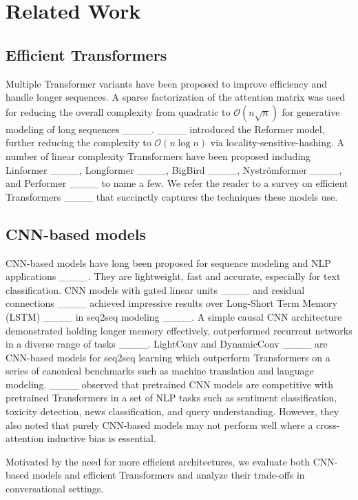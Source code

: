 \section{Related Work}
\subsection{Efficient Transformers} \label{eff_trans_rel_work}

Multiple Transformer variants have been proposed to improve efficiency and handle longer sequences. 
A sparse factorization of the attention matrix was used for reducing the overall complexity from quadratic to $\mathcal{O}(n\sqrt{n})$ for generative modeling of long sequences ____. 
____ introduced the Reformer model, further reducing the complexity to $\mathcal{O}(n\log{}n)$ via locality-sensitive-hashing. 
A number of linear complexity Transformers have been proposed including Linformer ____, Longformer ____, BigBird ____, Nystr{\"o}mformer ____, and Performer ____ to name a few. 
We refer the reader to a survey on efficient Transformers ____ that succinctly captures the techniques these models use.


\subsection{CNN-based models}

CNN-based models have long been proposed for sequence modeling and NLP applications ____. 
They are lightweight, fast and accurate, especially for text classification. 
CNN models with gated linear units ____ and residual connections ____ achieved impressive results over Long-Short Term Memory (LSTM) ____ in seq2seq modeling ____. 
A simple causal CNN architecture demonstrated holding longer memory effectively, outperformed recurrent networks in a diverse range of tasks ____.
LightConv and DynamicConv ____ are CNN-based models for seq2seq learning which outperform Transformers on a series of canonical benchmarks such as machine translation and language modeling.  
____ observed that pretrained CNN models are competitive with pretrained Transformers in a set of NLP tasks such as sentiment classification, toxicity detection, news classification, and query understanding. 
However, they also noted that purely CNN-based models may not perform well where a cross-attention inductive bias is essential. 


Motivated by the need for more efficient architectures, we evaluate both CNN-based models and efficient Transformers and analyze their trade-offs in conversational settings.